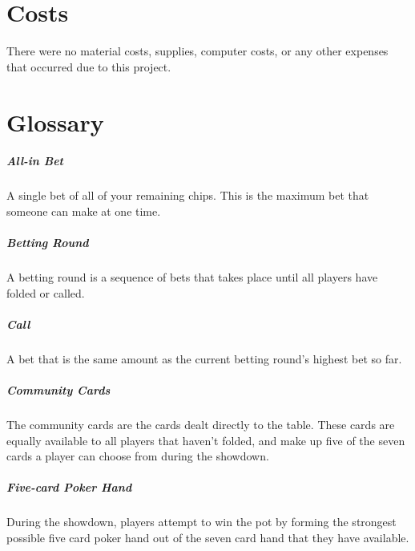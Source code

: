 
\clearpage

\chapter*{Costs}
There were no material costs, supplies, computer costs, or any other expenses that occurred due to this project.

\clearpage



\chapter*{Glossary}

\paragraph*{All-in Bet} A single bet of all of your remaining chips. This is the maximum bet that someone can make at one time.

\paragraph*{Betting Round} A betting round is a sequence of bets that takes place until all players have folded or called.

\paragraph*{Call} A bet that is the same amount as the current betting round's highest bet so far.
 
\paragraph*{Community Cards} The community cards are the cards dealt directly to the table. These cards are equally available to all players that haven't folded, and make up five of the seven cards a player can choose from during the showdown.
 
\paragraph*{Five-card Poker Hand} During the showdown, players attempt to win the pot by forming the strongest possible five card poker hand out of the seven card hand that they have available.
 
